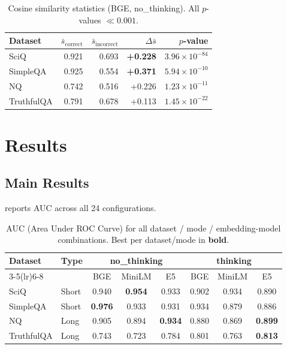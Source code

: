 \documentclass[11pt,a4paper]{article}
\begin{document}
\begin{table}[ht]
\centering
\caption{Cosine similarity statistics (BGE, no\_thinking). All $p$-values $\ll 0.001$.}
\label{tab:stats}
\begin{tabular}{lrrrr}
\toprule
\textbf{Dataset} & $\bar{s}_{\text{correct}}$ & $\bar{s}_{\text{incorrect}}$ &
  $\Delta\bar{s}$ & $p$-value \\
\midrule
SciQ       & 0.921 & 0.693 & \textbf{+0.228} & $3.96\times10^{-84}$ \\
SimpleQA   & 0.925 & 0.554 & \textbf{+0.371} & $5.94\times10^{-10}$ \\
NQ         & 0.742 & 0.516 & +0.226          & $1.23\times10^{-11}$ \\
TruthfulQA & 0.791 & 0.678 & +0.113          & $1.45\times10^{-22}$ \\
\bottomrule
\end{tabular}
\end{table}

\section{Results}
\label{sec:results}

\subsection{Main Results}

 reports AUC across all 24 configurations.

\begin{table}[ht]
\centering
\caption{AUC (Area Under ROC Curve) for all dataset / mode / embedding-model combinations.
Best per dataset/mode in \textbf{bold}.}
\label{tab:main}
\setlength{\tabcolsep}{5pt}
\begin{tabular}{ll ccc ccc}
\toprule
\multirow{2}{*}{\textbf{Dataset}} & \multirow{2}{*}{\textbf{Type}}
  & \multicolumn{3}{c}{\textbf{no\_thinking}}
  & \multicolumn{3}{c}{\textbf{thinking}} \\
\cmidrule(lr){3-5}\cmidrule(lr){6-8}
  & & BGE & MiniLM & E5 & BGE & MiniLM & E5 \\
\midrule
SciQ       & Short & 0.940 & \textbf{0.954} & 0.933 & 0.902 & 0.934 & 0.890 \\
SimpleQA   & Short & \textbf{0.976} & 0.933 & 0.931 & 0.934 & 0.879 & 0.886 \\
NQ         & Long  & 0.905 & 0.894 & \textbf{0.934} & 0.880 & 0.869 & \textbf{0.899} \\
TruthfulQA & Long  & 0.743 & 0.723 & 0.784 & 0.801 & 0.763 & \textbf{0.813} \\
\bottomrule
\end{tabular}
\end{table}
\end{document}
